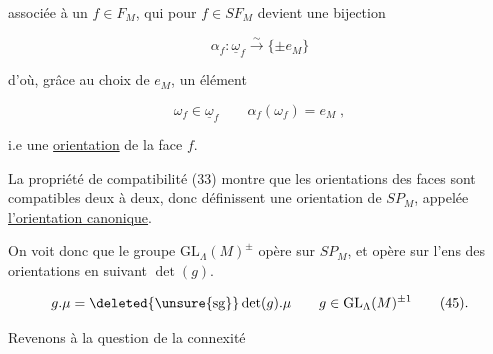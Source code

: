 
associée à un $f\in F_M$, qui pour $f\in SF_M$ devient une bijection

\[
\alpha_f:\underline{\omega}_f\overset{\sim}{\longrightarrow}\{\pm e_M\}\tag*{(43)}
\]

d'où, grâce au choix de $e_M$, un élément

\[
\omega_f\in\underline{\omega}_f\qquad\alpha_f(\omega_f)=e_M\;,\tag*{(44)}
\]

 i.e une \uline{orientation}  de la face $f$.

La propriété de compatibilité (33) montre que les orientations des faces  sont compatibles deux à deux, donc définissent une orientation \inserted{$\mu$} de $SP_M$, appelée \uline{l'orientation canonique}.

On voit donc que le groupe $\mathrm{GL}_\Lambda(M)^\pm$ opère sur $SP_M$, et opère sur l'ens des orientations en   suivant $\det(g)$.

\[
g.\mu=\deleted{\unsure{\operatorname{sg}}}\det(g).\mu\qquad g\in\mathrm{GL}_\Lambda(M)^{\pm1}\tag*{(45).}
\]

Revenons  à la question de la connexité

